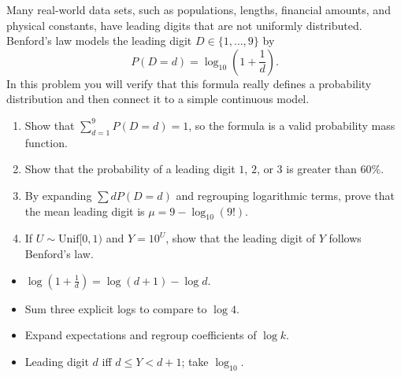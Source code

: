
\begin{problem}
Many real-world data sets, such as populations, lengths, financial amounts, and physical constants, have leading digits that are not uniformly distributed. Benford's law models the leading digit $D\in\{1,\ldots,9\}$ by
\[
P(D=d)=\log_{10}\!\left(1+\frac1d\right).
\]
In this problem you will verify that this formula really defines a probability distribution and then connect it to a simple continuous model.
\begin{enumerate}[label=\textbf{(\roman*)}]
\item Show that $\sum_{d=1}^{9}P(D=d)=1$, so the formula is a valid probability mass function.
\item Show that the probability of a leading digit $1$, $2$, or $3$ is greater than $60\%$.
\item By expanding $\sum dP(D=d)$ and regrouping logarithmic terms, prove that the mean leading digit is $\mu=9-\log_{10}(9!)$.
\item If $U\sim \mathrm{Unif}[0,1)$ and $Y=10^{U}$, show that the leading digit of $Y$ follows Benford's law.
\end{enumerate}


\end{problem}

\begin{hint}
\begin{itemize}[leftmargin=*]
\item $\log(1+\tfrac1d)=\log(d+1)-\log d$.
\item Sum three explicit logs to compare to $\log 4$.
\item Expand expectations and regroup coefficients of $\log k$.
\item Leading digit $d$ iff $d\le Y<d+1$; take $\log_{10}$.
\end{itemize}
\end{hint}

